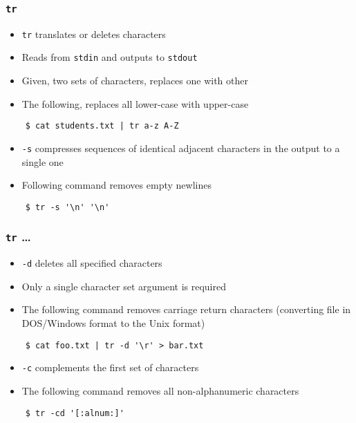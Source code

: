 \documentclass[12pt,compress]{beamer}
\begin{document}
\begin{frame}[fragile]
  \frametitle{\texttt{tr}}
  \begin{itemize}
  \item \texttt{tr} translates or deletes characters
  \item Reads from \texttt{stdin} and outputs to \texttt{stdout}
  \item Given, two sets of characters, replaces one with other
  \item The following, replaces all lower-case with upper-case 
  \end{itemize}
  \begin{lstlisting}
    $ cat students.txt | tr a-z A-Z
  \end{lstlisting} %
  \begin{itemize}
  \item \texttt{-s} compresses sequences of identical adjacent
    characters in the output to a single one
  \item Following command removes empty newlines
  \end{itemize}
  \begin{lstlisting}
    $ tr -s '\n' '\n'
  \end{lstlisting} %
\end{frame}

\begin{frame}[fragile]
  \frametitle{\texttt{tr} \ldots}
  \begin{itemize}
  \item \texttt{-d} deletes all specified characters
  \item Only a single character set argument is required
  \item The following command removes carriage return characters
    (converting file in DOS/Windows format to the Unix format)
  \end{itemize}
  \begin{lstlisting}
    $ cat foo.txt | tr -d '\r' > bar.txt
  \end{lstlisting} %
  \begin{itemize}
  \item \texttt{-c} complements the first set of characters
  \item The following command removes all non-alphanumeric characters
  \end{itemize}
  \begin{lstlisting}
    $ tr -cd '[:alnum:]'
  \end{lstlisting} %
\end{frame}
\end{document}
